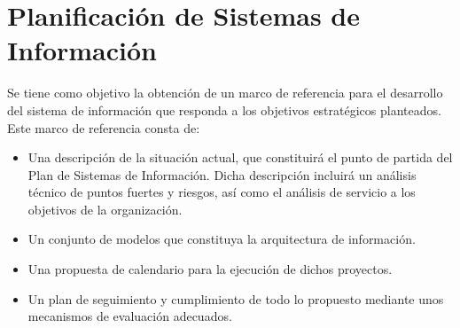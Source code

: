 \rhead{\newtitle}
\cfoot{\thepage}
\renewcommand{\headrulewidth}{1pt}
\renewcommand{\footrulewidth}{1pt}

\chapter{Planificación de Sistemas de Información}\label{ch_2-1}
\noindent Se tiene como objetivo la obtención de un marco de referencia para el desarrollo del sistema de información que responda a los objetivos estratégicos planteados. Este marco de referencia consta de:\\

\begin{itemize}
    \item Una descripción de la situación actual, que constituirá el punto de partida del Plan de Sistemas de Información. Dicha descripción incluirá un análisis técnico de puntos fuertes y riesgos, así como el análisis de servicio a los objetivos de la organización.
    \item Un conjunto de modelos que constituya la arquitectura de información.
    \item Una propuesta de calendario para la ejecución de dichos proyectos.
    \item Un plan de seguimiento y cumplimiento de todo lo propuesto mediante unos mecanismos de evaluación adecuados.
\end{itemize}

